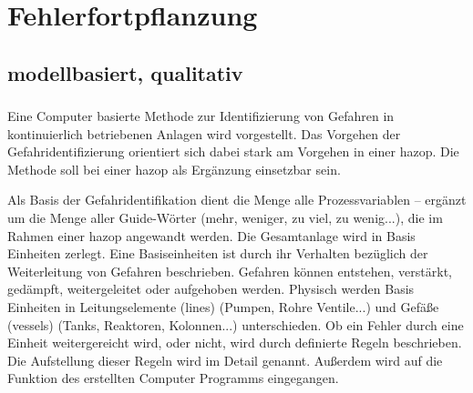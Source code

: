 


%
%

\section{Fehlerfortpflanzung}
\subsection{modellbasiert, qualitativ}
\subsubsection{\cite{Parmar_1987}} Eine Computer basierte Methode zur Identifizierung von Gefahren in kontinuierlich betriebenen Anlagen wird vorgestellt. Das Vorgehen der Gefahridentifizierung orientiert sich dabei stark am Vorgehen in einer \ac{hazop}. Die Methode soll bei einer \ac{hazop} als Erg\"anzung einsetzbar sein. 

Als Basis der Gefahridentifikation dient die Menge alle Prozessvariablen -- erg\"anzt um die Menge aller Guide-W\"orter (mehr, weniger, zu viel, zu wenig...), die im Rahmen einer \ac{hazop} angewandt werden. Die Gesamtanlage wird in Basis Einheiten zerlegt. Eine Basiseinheiten ist durch ihr Verhalten bez\"uglich der Weiterleitung von Gefahren beschrieben. Gefahren k\"onnen entstehen, verst\"arkt, ged\"ampft, weitergeleitet oder aufgehoben werden. Physisch werden Basis Einheiten in Leitungselemente (\glqq lines\grqq { }) (Pumpen, Rohre Ventile...) und Gef\"a\ss{}e (\glqq vessels\grqq { }) (Tanks, Reaktoren, Kolonnen...) unterschieden. Ob ein Fehler durch eine Einheit weitergereicht wird, oder nicht, wird durch definierte Regeln beschrieben. Die Aufstellung dieser Regeln wird im Detail genannt. Au\ss{}erdem wird auf die Funktion des erstellten Computer Programms eingegangen. 

